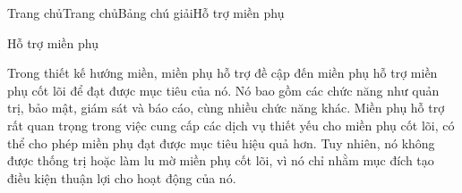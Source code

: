 



Trang chủTrang chủBảng chú giảiHỗ trợ miền phụ

Hỗ trợ miền phụ

Trong thiết kế hướng miền, miền phụ hỗ trợ đề cập đến miền phụ hỗ trợ miền phụ cốt lõi để đạt được mục tiêu của nó. Nó bao gồm các chức năng như quản trị, bảo mật, giám sát và báo cáo, cùng nhiều chức năng khác. Miền phụ hỗ trợ rất quan trọng trong việc cung cấp các dịch vụ thiết yếu cho miền phụ cốt lõi, có thể cho phép miền phụ đạt được mục tiêu hiệu quả hơn. Tuy nhiên, nó không được thống trị hoặc làm lu mờ miền phụ cốt lõi, vì nó chỉ nhằm mục đích tạo điều kiện thuận lợi cho hoạt động của nó.







